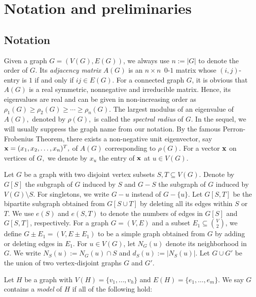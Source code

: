 \documentclass[11pt, a4paper]{article}
\theoremstyle{definition}
\newcommand{\<}{\subseteq}
\begin{document}
\section{Notation and preliminaries}\label{sec2}

\subsection{Notation}

Given a graph $G=(V(G),E(G))$, we always use $n:=|G|$ to denote the order of $G$. Its \textit{adjacency matrix} $A(G)$ is an {$n\times n$\, $0$-$1$ matrix} whose $(i,j)$-entry is $1$ if and only if $ij\in E(G)$.  For a connected graph $G$, it is obvious that $A(G)$ is a real symmetric, nonnegative and irreducible matrix. {Hence,} its eigenvalues are real and can be given in non-increasing order as $\rho_1(G)\geqslant \rho_2(G)\geqslant \cdots \geqslant \rho_n(G)$. The largest modulus of an eigenvalue of $A(G),$  denoted by $\rho(G),$ is called {the} \textit{spectral radius} of $G$. In the sequel, we will usually suppress the graph name from our notation. By the famous Perron-Frobenius Theorem, there exists a non-negative unit eigenvector, say ${\bf x}=(x_1,x_2,\ldots,x_n)^T,$ of $A(G)$ corresponding to  $\rho(G)$. For a vector ${\bf x}$ on vertices of $G,$ we denote by $x_u$ the entry of ${\bf x}$ at $u\in V(G).$

Let $G$ be a graph  with two disjoint vertex subsets $S, T\subseteq V(G)$. Denote by $G[S]$ the subgraph of $G$ induced by $S$ {and $G-S$ the subgraph of $G$ induced by $V(G)\setminus S$. For singletons, we write $G-u$ instead of $G-\{u\}$.} 
Let $G[S,T]$ be the bipartite subgraph obtained from $G[S\cup T]$ by deleting all its edges within $S$ or $T$.
We use $e(S)$ and $e(S,T)$ to denote the numbers of edges in $G[S]$ and $G[S,T]$, respectively.
For a graph $G=(V,E)$ and a subset $E_1\subseteq \binom{V}{2}$, we define $G\pm E_1=(V,E\pm E_1)$ to be a simple  graph obtained from 
$G$ by adding or deleting edges in $E_1$. For $u\in V(G)$, let $N_G(u)$ denote its neighborhood in $G$. We write $N_S(u):=N_G(u)\cap S$ and $d_S(u):=|N_S(u)|$.
Let $G\cup G'$ be the union of two vertex-disjoint graphs $G$ and $G'$.

Let $H$ be a graph with $V(H)=\{v_1,\ldots,v_h\}$ and $E(H)=\{e_1,\ldots,e_{m}\}$. We say $G$ contains a \textit{model} of $H$  if all of the following hold: 
\end{document}
